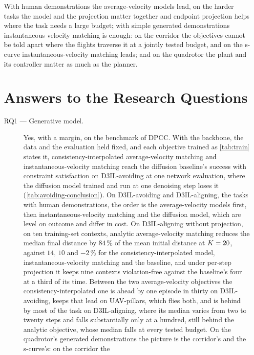 With human demonstrations the average-velocity models lead, on the harder tasks the model and the
projection matter together and endpoint projection helps where the task needs a large budget; with
simple generated demonstrations instantaneous-velocity matching is enough: on the corridor the
objectives cannot be told apart where the flights traverse it at a jointly tested budget, and on the
s-curve instantaneous-velocity matching leads; and on the quadrotor the plant and its controller
matter as much as the planner.

\section{Answers to the Research Questions}\label{sec:conc:rqs}

\begin{description}
  \item[RQ1 --- Generative model.] Yes, with a margin, on the benchmark of \ac{DPCC}. With the
    backbone, the data and the evaluation held fixed, and each objective trained as \autoref{tab:train} states
    it, consistency-interpolated average-velocity
    matching and instantaneous-velocity matching reach the diffusion baseline's success with
    constraint satisfaction on D3IL-avoiding at one network evaluation, where the diffusion model
    trained and run at one denoising step loses it (\autoref{tab:avoiding-conclusion}). On D3IL-avoiding and
    D3IL-aligning, the tasks with human demonstrations, the order is the average-velocity models
    first, then instantaneous-velocity matching and the diffusion model, which are level on outcome
    and differ in cost. On D3IL-aligning without projection, on ten training-set contexts, analytic average-velocity matching
    reduces the median final distance by $84\,\%$ of the mean initial distance at $K = 20$,
    against $14$, $10$ and $-2\,\%$ for the consistency-interpolated model, instantaneous-velocity
    matching and the baseline, and under per-step projection it keeps nine contexts violation-free
    against the baseline's four at a third of its time. Between the two average-velocity objectives
    the consistency-interpolated one is ahead by one episode in thirty on D3IL-avoiding, keeps that
    lead on UAV-pillars, which flies both, and is behind by most of the task on D3IL-aligning, where
    its median varies from two to twenty steps and falls substantially only at a hundred, still
    behind the analytic objective, whose median falls at every tested budget. On the quadrotor's
    generated demonstrations the picture is the corridor's and the s-curve's: on the corridor the

\end{description}

